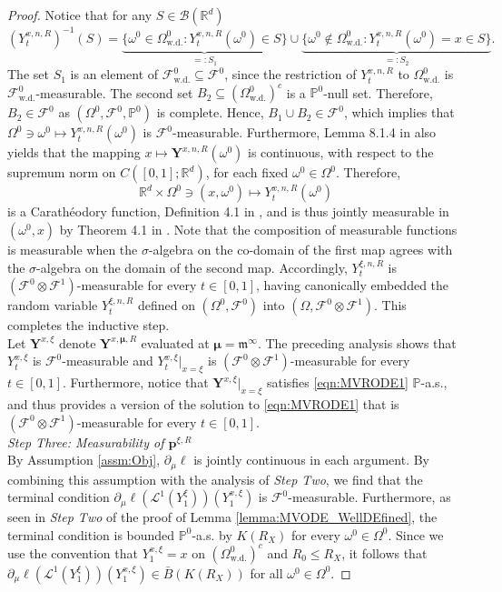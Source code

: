 \documentclass{article}
\newcommand{\R}{\mathbb{R}}
\begin{document}
\begin{appendices}
\begin{proof}
Notice that for any $S \in \mathcal B(\R^d)$
\[
(Y^{x,n,R}_t)^{-1}(S) = \underbrace{\{ \omega^0\in \Omega^{0}_\mathrm{w.d.}\colon Y^{x,n,R}_t(\omega^0)\in S\}}_{=:S_1}\cup \underbrace{\{\omega^0\notin \Omega^0_\mathrm{w.d.}\colon Y^{x,n,R}_t(\omega^0)=x\in S\}}_{=:S_2}.
\]
The set $S_1$ is an element of $\mathcal F^0_{\mathrm{w.d.}}\subseteq \mathcal F^0$, since the restriction of $Y^{x,n,R}_t$ to $\Omega^0_\mathrm{w.d.}$ is $\mathcal F^0_\mathrm{w.d.}$-measurable. 
The second set $B_2\subseteq (\Omega^0_\mathrm{w.d.})^c$ is a $\mathbb P^0$-null set. Therefore, $B_2\in \mathcal F^0$ as $(\Omega^0,\mathcal F^0,\mathbb P^0)$ is complete. Hence, $B_1\cup B_2\in \mathcal F^0$, which implies that $\Omega^0\ni\omega^0\mapsto Y^{x,n,R}_t(\omega^0)$ is $\mathcal F^0$-measurable. Furthermore, Lemma 8.1.4 in \cite{Ambrosio2008} also yields that the mapping $x\mapsto \bm{Y}^{x,n,R}(\omega^0)$ is continuous, with respect to the supremum norm on $C([0,1];\R^d)$, for each fixed $\omega^0\in \Omega^0$. Therefore, \[\R^d\times \Omega^0\ni(x,\omega^0)\mapsto Y^{x,n,R}_t(\omega^0)\]
 is a Carath\'eodory function, Definition 4.1 in \cite{AZHMYAKOV201987}, and is thus jointly measurable in $(\omega^0,x)$ by Theorem 4.1 in \cite{AZHMYAKOV201987}. Note that the composition of measurable functions is measurable when the $\sigma$-algebra on the co-domain of the first map agrees with the $\sigma$-algebra on the domain of the second map. Accordingly, $Y^{\xi,n,R}_t$ is $(\mathcal F^0\otimes\mathcal F^1)$-measurable for every $t\in[0,1]$, having canonically embedded the random variable $Y^{\xi,n,R}_t$ defined on $(\Omega^0,\mathcal F^0)$ into $(\Omega,\mathcal F^0\otimes \mathcal F^1)$. This completes the inductive step.\\

Let $\bm Y^{x,\xi}$ denote $\bm Y^{x,\bm\mu,R}$ evaluated at $\bm\mu=\bm{\mathfrak{m}}^\infty$. The preceding analysis shows that $Y^{x,\xi}_t$ is $\mathcal F^0$-measurable and $Y^{x,\xi}_t|_{x=\xi}$ is $(\mathcal F^0\otimes \mathcal F^1)$-measurable for every $t\in[0,1]$. Furthermore, notice that $\bm Y^{x,\xi}|_{x=\xi}$ satisfies \eqref{eqn:MVRODE1} $\mathbb P$-a.s., and thus provides a version of the solution to \eqref{eqn:MVRODE1} that is $(\mathcal F^0\otimes \mathcal F^1)$-measurable for every $t\in[0,1]$. \\


\textit{Step Three: Measurability of $\bm{p}^{\xi,R}$} \\

By Assumption \ref{assm:Obj}, $\partial_\mu\ell$ is jointly continuous in each argument. By combining this assumption with the analysis of \textit{Step Two}, we find that the terminal condition $\partial_\mu\ell(\mathcal L^1(Y^\xi_1))(Y^{x,\xi}_1)$ is $\mathcal F^0$-measurable. Furthermore, as seen in \textit{Step Two} of the proof of Lemma \ref{lemma:MVODE_WellDEfined}, the terminal condition is bounded $\mathbb P^0$-a.s. by $K(R_X)$ for every $\omega^0\in \Omega^0$. Since we use the convention that $Y_1^{x,\xi}=x$ on $(\Omega^0_\mathrm{w.d.})^c$ and $R_0\le R_X$, it follows that $\partial_\mu\ell(\mathcal L^1(Y^\xi_1))(Y^{x,\xi}_1)\in \bar B(K(R_X))$ for all $\omega^0\in\Omega^0$. 


\end{proof}
\end{appendices}
\end{document}
